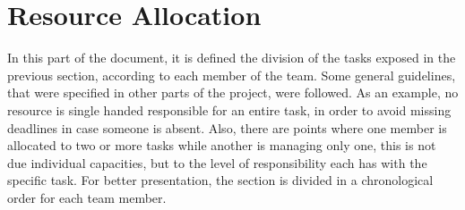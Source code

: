\documentclass[a4paper]{article}
\begin{document}
\section{Resource Allocation}
In this part of the document, it is defined the division of the tasks exposed in the previous section, according to each member of the team. \newline
Some general guidelines, that were specified in other parts of the project, were followed. As an example, no resource is single handed responsible for an entire task, in order to avoid missing deadlines in case someone is absent. Also, there are points where one member is allocated to two or more tasks while another is managing only one, this is not due individual capacities, but to the level of responsibility each has with the specific task. \newline
For better presentation, the section is divided in a chronological order for each team member. 
 
\end{document}
